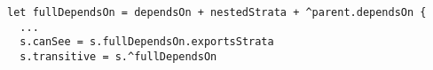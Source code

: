 \lstset{frame=tb, aboveskip=12pt, belowskip=-3pt, breaklines=true, basicstyle=\small\ttfamily, tabsize=2, mathescape=true}
\begin{lstlisting}[caption={base\_facts.als, lines 11-40}, label=alloy:cansee, captionpos=b]
let fullDependsOn = dependsOn + nestedStrata + ^parent.dependsOn {
  ...
  s.canSee = s.fullDependsOn.exportsStrata
  s.transitive = s.^fullDependsOn
\end{lstlisting}
